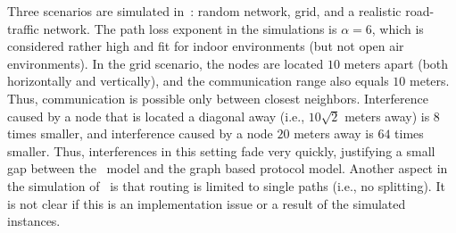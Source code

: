 \documentclass[11pt]{article}
\newenvironment{proof sketch}[1]{\noindent {\emph{Proof sketch of #1:}}}{\hfill \qed}
\newcommand{\SINR}{\text{\sc{sinr}}}
\begin{document}
Three scenarios are simulated in~\cite{chafekarPhD}: random network,
grid, and a realistic road-traffic network. The path loss exponent in
the simulations is $\alpha=6$, which is considered rather high and fit
for indoor environments (but not open air environments). In the grid
scenario, the nodes are located $10$ meters apart (both horizontally
and vertically), and the communication range also equals $10$ meters.
Thus, communication is possible only between closest neighbors.
Interference caused by a node that is located a diagonal away (i.e.,
$10\sqrt{2}$ meters away) is $8$ times smaller, and interference
caused by a node $20$ meters away is $64$ times smaller. Thus,
interferences in this setting fade very quickly, justifying a small
gap between the \SINR\ model and the graph based protocol model.
Another aspect in the simulation of~\cite{chafekarPhD} is that routing
is limited to single paths (i.e., no splitting). It is not clear if
this is an implementation issue or a result of the simulated
instances.
\end{document}
